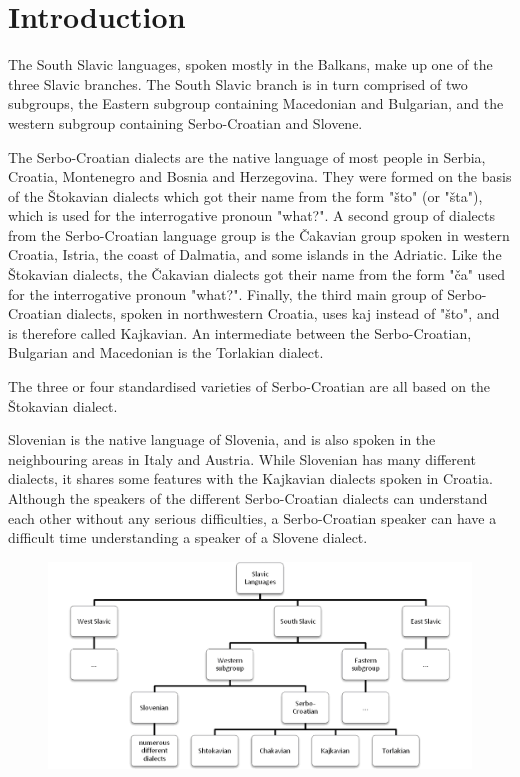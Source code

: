 
\section{Introduction}

The South Slavic languages, spoken mostly in the Balkans, make up one of the three Slavic 
branches. The South Slavic branch is in turn comprised of two subgroups, the Eastern 
subgroup containing Macedonian and Bulgarian, and the western subgroup containing 
Serbo-Croatian and Slovene.

The Serbo-Croatian dialects are the native language of most people in Serbia, Croatia, 
Montenegro and Bosnia and Herzegovina. They were formed on the basis of the Štokavian dialects 
which got their name from the form "što" (or "šta"), which is used for the interrogative pronoun "what?". A second group of dialects from the Serbo-Croatian language group is the Čakavian group spoken in western Croatia, Istria, the coast of Dalmatia, and some islands in the Adriatic. Like the Štokavian dialects, the Čakavian dialects got their name from the form "ča" used for the interrogative pronoun "what?". Finally, the third main group of Serbo-Croatian dialects, spoken in northwestern Croatia, uses kaj instead of "što", and is therefore called Kajkavian.
An intermediate between the Serbo-Croatian, Bulgarian and Macedonian is the Torlakian dialect.

The three or four standardised varieties of Serbo-Croatian are all based on the Štokavian dialect.

Slovenian is the native language of Slovenia, and is also spoken in the neighbouring areas in Italy and Austria. While Slovenian has many different dialects, it shares some features with the Kajkavian dialects spoken in Croatia. Although the speakers of the different Serbo-Croatian dialects can understand each other without any serious difficulties, a Serbo-Croatian speaker can have a difficult time understanding a speaker of a Slovene dialect.

\begin{figure}[ht]
\centering
\includegraphics[scale=0.6]{images/chart.png}

\end{figure}


\begin{figure}


\end{figure}

